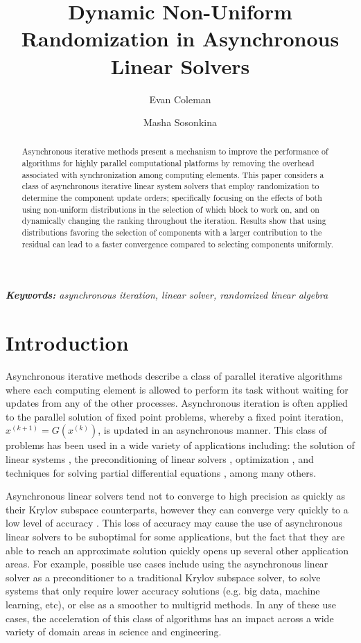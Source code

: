 \documentclass{article}
\title{Dynamic Non-Uniform Randomization in Asynchronous Linear Solvers}
\author{Evan Coleman \and Masha Sosonkina}
\date{}
\theoremstyle{definition}
\theoremstyle{example}
\theoremstyle{example}
\theoremstyle{example}
\begin{document}
	
\maketitle

\begin{abstract}
	Asynchronous iterative methods present a mechanism to improve the performance of algorithms for highly parallel computational platforms by removing the overhead associated with synchronization among computing elements. This paper considers a class of asynchronous iterative linear system solvers that employ randomization to determine the component update orders; specifically focusing on the effects of both using non-uniform distributions in the selection of which block to work on, and on dynamically changing the ranking throughout the iteration. Results show that using distributions favoring the selection of components with a larger contribution to the residual can lead to a faster convergence compared to selecting components uniformly. 
\end{abstract}
\noindent
{\em {\bf Keywords:} asynchronous iteration, linear solver, randomized linear algebra}


%
\section{Introduction}
\label{sec:intro}

Asynchronous iterative methods describe a class of parallel iterative algorithms where each computing element is allowed to perform its task without waiting for updates from any of the other processes. Asynchronous iteration is often applied to the parallel solution of fixed point problems, whereby a fixed point iteration, $x^{(k+1)} = G(x^{(k)})$, is updated in an asynchronous manner. This class of problems has been used in a wide variety of applications including: the solution of linear systems \cite{recht2011hogwild}, the preconditioning of linear solvers \cite{chow2015fine}, optimization \cite{srivastava2011distributed}, and techniques for solving partial differential equations \cite{magoules2015asynchronous}, among many others. 

Asynchronous linear solvers tend not to converge to high precision as quickly as their Krylov subspace counterparts, however they can converge very quickly to a low level of accuracy \cite{avron2015revisiting}. This loss of accuracy may cause the use of asynchronous linear solvers to be suboptimal for some applications, but the fact that they are able to reach an approximate solution quickly opens up several other application areas. For example, possible use cases include using the asynchronous linear solver as a preconditioner to a traditional Krylov subspace solver, to solve systems that only require lower accuracy solutions (e.g. big data, machine learning, etc), or else as a smoother to multigrid methods. In any of these use cases, the acceleration of this class of algorithms has an impact across a wide variety of domain areas in science and engineering.
\end{document}

